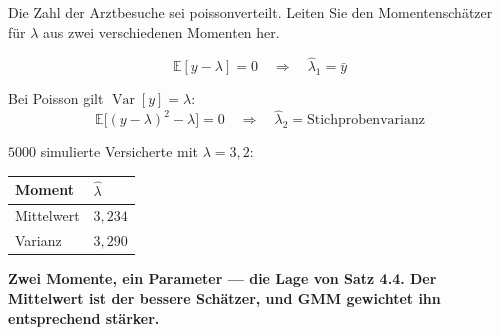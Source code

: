 \begin{aufgabe}
Die Zahl der Arztbesuche sei poissonverteilt. Leiten Sie den Momentenschätzer für $\lambda$ aus zwei verschiedenen Momenten her.

\loesung
{}
\[ \mathbb{E}[y - \lambda] = 0 \quad\Longrightarrow\quad \hat\lambda_1 = \bar y \]

Bei Poisson gilt $\operatorname{Var}[y] = \lambda$:
\[ \mathbb{E}\bigl[(y-\lambda)^{2} - \lambda\bigr] = 0 \quad\Longrightarrow\quad \hat\lambda_2 = \text{Stichprobenvarianz} \]

$5000$ simulierte Versicherte mit $\lambda = 3{,}2$:
\begin{center}
{\small
\renewcommand{\arraystretch}{1.48}
\begin{tabular}{@{}P{2.6cm}P{2.4cm}@{}}
\toprule
\textbf{Moment} & $\hat\lambda$\\
\midrule
Mittelwert & $3{,}234$\\
Varianz & $3{,}290$\\
\bottomrule
\end{tabular}}
\end{center}

\begin{center}
\begin{minipage}{0.9\textwidth}
\textbf{Zwei Momente, ein Parameter --- die Lage von Satz 4.4. Der Mittelwert ist der bessere Schätzer, und GMM gewichtet ihn entsprechend stärker.}
\end{minipage}
\end{center}

\begin{center}
\begin{minipage}{0.88\textwidth}
\end{minipage}
\end{center}
\end{aufgabe}

